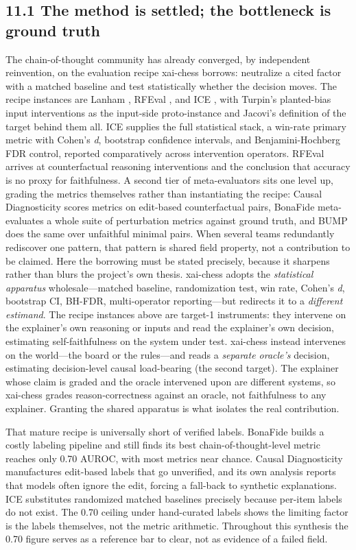 \documentclass[conference]{IEEEtran}
\begin{document}
\subsection*{11.1 The method is settled; the bottleneck is ground truth}
The chain-of-thought community has already converged, by independent reinvention, on the evaluation recipe xai-chess borrows: neutralize a cited factor with a matched baseline and test statistically whether the decision moves. The recipe instances are Lanham \cite{ref29}, RFEval \cite{ref16}, and ICE \cite{ref17}, with Turpin's planted-bias input interventions \cite{ref28} as the input-side proto-instance and Jacovi's definition of the target \cite{ref30} behind them all. ICE \cite{ref17} supplies the full statistical stack, a win-rate primary metric with Cohen's \textit{d}, bootstrap confidence intervals, and Benjamini-Hochberg FDR control, reported comparatively across intervention operators. RFEval \cite{ref16} arrives at counterfactual reasoning interventions and the conclusion that accuracy is no proxy for faithfulness. A second tier of meta-evaluators sits one level up, grading the metrics themselves rather than instantiating the recipe: Causal Diagnosticity \cite{ref15} scores metrics on edit-based counterfactual pairs, BonaFide \cite{ref14} meta-evaluates a whole suite of perturbation metrics against ground truth, and BUMP \cite{ref44} does the same over unfaithful minimal pairs. When several teams redundantly rediscover one pattern, that pattern is shared field property, not a contribution to be claimed. Here the borrowing must be stated precisely, because it sharpens rather than blurs the project's own thesis. xai-chess adopts the \textit{statistical apparatus} wholesale---matched baseline, randomization test, win rate, Cohen's \textit{d}, bootstrap CI, BH-FDR, multi-operator reporting---but redirects it to a \textit{different estimand}. The recipe instances above are target-1 instruments: they intervene on the explainer's own reasoning or inputs and read the explainer's own decision, estimating self-faithfulness on the system under test. xai-chess instead intervenes on the world---the board or the rules---and reads a \textit{separate oracle's} decision, estimating decision-level causal load-bearing (the second target). The explainer whose claim is graded and the oracle intervened upon are different systems, so xai-chess grades reason-correctness against an oracle, not faithfulness to any explainer. Granting the shared apparatus is what isolates the real contribution.

That mature recipe is universally short of verified labels. BonaFide \cite{ref14} builds a costly labeling pipeline and still finds its best chain-of-thought-level metric reaches only 0.70 AUROC, with most metrics near chance. Causal Diagnosticity \cite{ref15} manufactures edit-based labels that go unverified, and its own analysis reports that models often ignore the edit, forcing a fall-back to synthetic explanations. ICE \cite{ref17} substitutes randomized matched baselines precisely because per-item labels do not exist. The 0.70 ceiling under hand-curated labels shows the limiting factor is the labels themselves, not the metric arithmetic. Throughout this synthesis the 0.70 figure serves as a reference bar to clear, not as evidence of a failed field.
\end{document}
